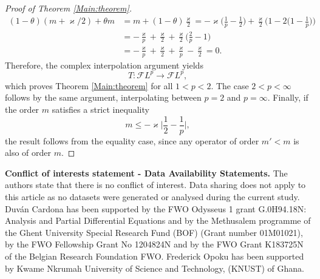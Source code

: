\documentclass[12pt, reqno]{amsart}
\theoremstyle{definition}
\theoremstyle{remark}
\numberwithin{equation}{section}
\begin{document}
\begin{proof}[Proof of Theorem \ref{Main:theorem}]
\begin{align*}
(1-\theta)(m+\varkappa/2)+\theta m
&= m + (1-\theta)\frac \varkappa2 = -\varkappa\Big(\frac1p-\frac12\Big)
+ \frac \varkappa2\Big(1-2\Big(1-\frac1p\Big)\Big) \\
&= -\frac \varkappa p+\frac \varkappa2
+ \frac \varkappa2\Big(\frac{2}{p}-1\Big) \\
&= -\frac \varkappa p+\frac \varkappa2+\frac \varkappa{p}-\frac \varkappa2 = 0.
\end{align*}
Therefore, the complex interpolation argument yields
\[
T:\mathcal{F}L^p\longrightarrow \mathcal{F}L^p,
\]
which proves Theorem \ref{Main:theorem} for all $1<p<2$.
The case $2<p<\infty$ follows by the same argument, interpolating between
$p=2$ and $p=\infty$. 
Finally, if the order $m$ satisfies a strict inequality \[ m \le -\varkappa \bigg|\dfrac{1}{2}-\dfrac{1}{p}\bigg|,\]
the
result follows from the equality case, since any operator of order $m'<m$ is
also of order $m$.
\end{proof}
\noindent\textbf{Conflict of interests statement - Data Availability Statements.}  The authors state that there is no conflict of interest.  Data sharing does not apply to this article as no datasets were generated or
analysed during the current study. \\

   Duv\'an Cardona has been  supported  by the FWO  Odysseus  1  grant  G.0H94.18N:  Analysis  and  Partial Differential Equations and by the Methusalem programme of the Ghent University Special Research Fund (BOF)
(Grant number 01M01021), by the FWO Fellowship
Grant No 1204824N and by the FWO Grant K183725N of the Belgian Research Foundation FWO. Frederick Opoku has been supported by Kwame Nkrumah University of Science and Technology, (KNUST) of Ghana.
\end{document}
